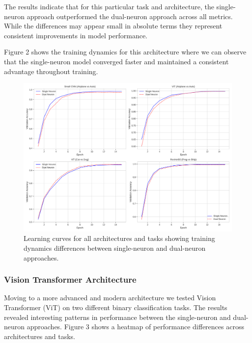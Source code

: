 \documentclass[11pt]{article}
\begin{document}
The results indicate that for this particular task and architecture, the single-neuron approach outperformed the dual-neuron approach across all metrics. While the differences may appear small in absolute terms they represent consistent improvements in model performance.

Figure 2 shows the training dynamics for this architecture where we can observe that the single-neuron model converged faster and maintained a consistent advantage throughout training.

\begin{figure}[htbp]
\centering
\includegraphics[width=\textwidth]{figures/learning_curves.png}
\caption{Learning curves for all architectures and tasks showing training dynamics differences between single-neuron and dual-neuron approaches.}
\end{figure}

\subsubsection{Vision Transformer Architecture}
Moving to a more advanced and modern architecture we tested Vision Transformer (ViT) on two different binary classification tasks. The results revealed interesting patterns in performance between the single-neuron and dual-neuron approaches. Figure 3 shows a heatmap of performance differences across architectures and tasks.
\end{document}

